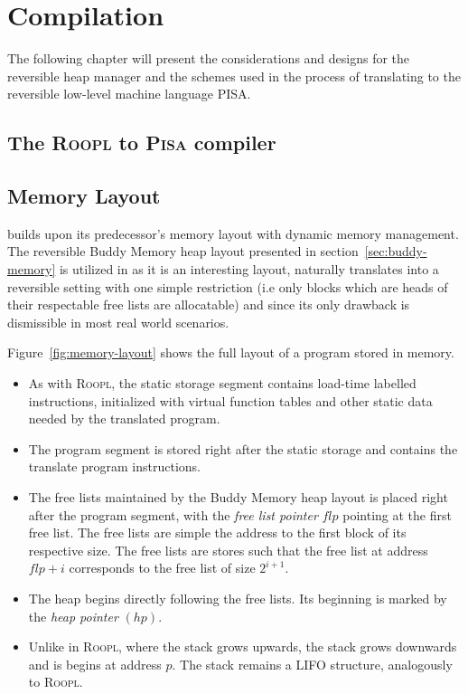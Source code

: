 \chapter{Compilation}
\label{chp:compilation}
The following chapter will present the considerations and designs for the reversible heap manager and the schemes used in the process of translating \rooplpp to the reversible low-level machine language \textsc{PISA}.

\section{The \textsc{Roopl} to \textsc{Pisa} compiler}
\label{sec:roopl-to-pisa-compiler}

\section{\rooplpp Memory Layout}
\label{sec:rooplpp-memory-layout}
\rooplpp builds upon its predecessor's memory layout with dynamic memory management. The reversible Buddy Memory heap layout presented in section~\ref{sec:buddy-memory} is utilized in \rooplpp as it is an interesting layout, naturally translates into a reversible setting with one simple restriction (i.e only blocks which are heads of their respectable free lists are allocatable) and since its only drawback is dismissible in most real world scenarios.

Figure~\ref{fig:memory-layout} shows the full layout of a \rooplpp program stored in memory.

\begin{itemize}
    \item As with \textsc{Roopl}, the static storage segment contains load-time labelled  instructions, initialized with virtual function tables and other static data needed by the translated program.

    \item The program segment is stored right after the static storage and contains the translate \rooplpp program instructions.

    \item The free lists maintained by the Buddy Memory heap layout is placed right after the program segment, with the \textit{free list pointer} $flp$ pointing at the first free list. The free lists are simple the address to the first block of its respective size. The free lists are stores such that the free list at address $flp + i$ corresponds to the free list of size $2^{i+1}$.   

    \item The heap begins directly following the free lists. Its beginning is marked by the \textit{heap pointer} $(hp)$. 

    \item Unlike in \textsc{Roopl}, where the stack grows upwards, the \rooplpp stack grows downwards and is begins at address $p$. The stack remains a LIFO structure, analogously to \textsc{Roopl}.
\end{itemize}

